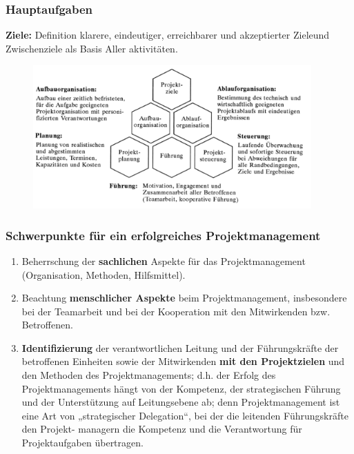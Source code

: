 \documentclass[11pt,a4paper]{article}
\begin{document}
\subsubsection{Hauptaufgaben}
\textbf{Ziele:} Definition klarere, eindeutiger, erreichbarer und akzeptierter Zieleund Zwischenziele als Basis Aller aktivitäten.
\begin{figure}[H]
\centering
\includegraphics[width=0.95\textwidth]{hauptaufgabendesprojektmanagements}

\end{figure}


\subsubsection{Schwerpunkte für ein erfolgreiches Projektmanagement}

\begin{enumerate}
\item Beherrschung der \textbf{sachlichen} Aspekte für das Projektmanagement
(Organisation, Methoden, Hilfsmittel).

\item Beachtung \textbf{menschlicher Aspekte} beim Projektmanagement,
insbesondere bei der Teamarbeit und bei der Kooperation mit den
Mitwirkenden bzw. Betroffenen.

\item \textbf{Identifizierung} der verantwortlichen Leitung und der Führungskräfte
der betroffenen Einheiten sowie der Mitwirkenden \textbf{mit den Projektzielen}
und den Methoden des Projektmanagements;
d.h. der Erfolg des Projektmanagements hängt von der Kompetenz,
der strategischen Führung und der Unterstützung auf Leitungsebene
ab; denn Projektmanagement ist eine Art von „strategischer
Delegation“, bei der die leitenden Führungskräfte den Projekt-
managern die Kompetenz und die Verantwortung für Projektaufgaben
übertragen.
\end{enumerate}
\end{document}
